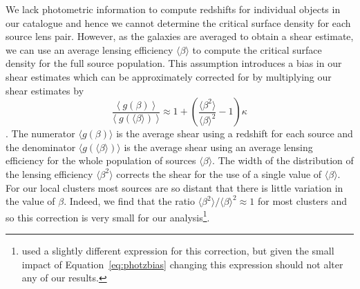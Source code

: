 \documentclass[useAMS,usenatbib]{mnras}
\begin{document}
We lack photometric information to compute redshifts for individual objects in our catalogue and hence we cannot determine the critical surface density for each source lens pair. However, as the galaxies are averaged to obtain a shear estimate, we can use an average lensing efficiency $\langle \beta \rangle$ to compute the critical surface density for the full source population. This assumption introduces a bias in our shear estimates which can be approximately corrected for by multiplying our shear estimates by
\begin{equation}
 \frac{\langle\hspace{3pt}  g(\beta)\hspace{3pt}  \rangle}{\langle \hspace{3pt} g(\langle \beta \rangle) \hspace{3pt} \rangle}  \approx 1+\left(\dfrac{\langle \beta^2 \rangle}{\langle \beta \rangle^2} -1\right) \kappa 
 \label{eq:photzbias}
\end{equation}
\citep[Equation 7 in][]{hoekstra00}. The numerator $\langle g(\beta) \rangle$ is the average shear using a redshift for each source and the denominator $\langle g(\langle \beta \rangle) \rangle$ is the average shear using an average lensing efficiency for the whole population of sources $\langle \beta \rangle$.  The width of the distribution of the lensing efficiency $\langle \beta^2 \rangle$ corrects the shear for the use of a single value of $\langle \beta \rangle$. For our local clusters most sources are so distant that there is little variation in the value of $\beta$. Indeed, we find that the ratio $\langle \beta^2 \rangle / \langle \beta \rangle^2 \approx 1$ for most clusters and so this correction is very small for our analysis\footnote{\citet{applegate14} used a slightly different expression for this correction, but given the small impact of Equation~\ref{eq:photzbias} changing this expression should not alter any of our results.}. 
\end{document}
